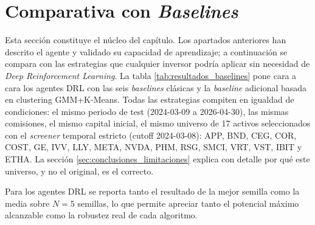 \documentclass[IB,a4paper]{TFUOC}
\begin{document}
\section{Comparativa con \textit{Baselines}}
\label{sec:resultados_baselines}

Esta sección constituye el núcleo del capítulo. Los apartados anteriores han descrito el agente y validado su capacidad de aprendizaje; a continuación se compara con las estrategias que cualquier inversor podría aplicar sin necesidad de \textit{Deep Reinforcement Learning}. La tabla \ref{tab:resultados_baselines} pone cara a cara los agentes DRL con las seis \textit{baselines} clásicas y la \textit{baseline} adicional basada en clustering GMM+K-Means. Todas las estrategias compiten en igualdad de condiciones: el mismo periodo de test (2024-03-09 a 2026-04-30), las mismas comisiones, el mismo capital inicial, el mismo universo de 17 activos seleccionados con el \textit{screener} temporal estricto (cutoff 2024-03-08): APP, BND, CEG, COR, COST, GE, IVV, LLY, META, NVDA, PHM, RSG, SMCI, VRT, VST, IBIT y ETHA. La sección \ref{sec:conclusiones_limitaciones} explica con detalle por qué este universo, y no el original, es el correcto.

Para los agentes DRL se reporta tanto el resultado de la mejor semilla como la media sobre $N=5$ semillas, lo que permite apreciar tanto el potencial máximo alcanzable como la robustez real de cada algoritmo.
\end{document}
